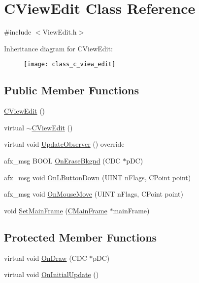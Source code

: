 \hypertarget{class_c_view_edit}{\section{C\+View\+Edit Class Reference}
\label{class_c_view_edit}
}


{\ttfamily \#include $<$View\+Edit.\+h$>$}

Inheritance diagram for C\+View\+Edit\+:\begin{figure}[H]
\begin{center}
\leavevmode
\texttt{[image: class\_c\_view\_edit]}
\end{center}
\end{figure}
\subsection*{Public Member Functions}
\begin{DoxyCompactItemize}
\item 
\hyperlink{class_c_view_edit_a99fea37450207a1ffe8cf6b46ec2a11f}{C\+View\+Edit} ()
\item 
virtual \hyperlink{class_c_view_edit_a968f16ef61489033c80ebe504017db3a}{$\sim$\+C\+View\+Edit} ()
\item 
virtual void \hyperlink{class_c_view_edit_ac2b73f20fe10a4a98096facde6450e5a}{Update\+Observer} () override
\item 
afx\+\_\+msg B\+O\+O\+L \hyperlink{class_c_view_edit_a66446b22920245bb3b5c5735754d63cd}{On\+Erase\+Bkgnd} (C\+D\+C $\ast$p\+D\+C)
\item 
afx\+\_\+msg void \hyperlink{class_c_view_edit_a0e77d59dd1ed299c933f660d9ff0cf7e}{On\+L\+Button\+Down} (U\+I\+N\+T n\+Flags, C\+Point point)
\item 
afx\+\_\+msg void \hyperlink{class_c_view_edit_aba0b38ee4b51f9d98bc08ade92d9f051}{On\+Mouse\+Move} (U\+I\+N\+T n\+Flags, C\+Point point)
\item 
void \hyperlink{class_c_view_edit_a28bb793d43baba78e9b1c704b4f0e128}{Set\+Main\+Frame} (\hyperlink{class_c_main_frame}{C\+Main\+Frame} $\ast$main\+Frame)
\end{DoxyCompactItemize}
\subsection*{Protected Member Functions}
\begin{DoxyCompactItemize}
\item 
virtual void \hyperlink{class_c_view_edit_a8cf50c2cebab5aaecda5ae6f7437cf38}{On\+Draw} (C\+D\+C $\ast$p\+D\+C)
\item 
virtual void \hyperlink{class_c_view_edit_ac49ed2e9e35cd014c6539aaa4ac705f3}{On\+Initial\+Update} ()
\end{DoxyCompactItemize}


